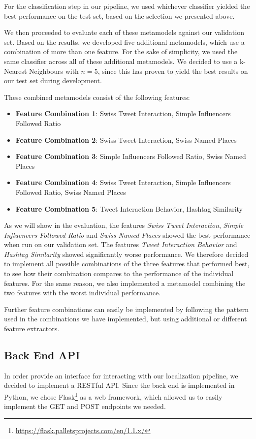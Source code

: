 \documentclass[10pt,a4paper]{article}
\begin{document}
For the classification step in our pipeline, we used whichever classifier yielded the best performance on the test set, based on the selection we presented above.

We then proceeded to evaluate each of these metamodels against our validation set. Based on the results, we developed five additional metamodels, which use a combination of more than one feature. For the sake of simplicity, we used the same classifier across all of these additional metamodels. We decided to use a k-Nearest Neighbours with $n=5$, since this has proven to yield the best results on our test set during development.

These combined metamodels consist of the following features:

\begin{itemize}
\item \textbf{Feature Combination 1}: Swiss Tweet Interaction, Simple Influencers Followed Ratio
\item \textbf{Feature Combination 2}: Swiss Tweet Interaction, Swiss Named Places
\item \textbf{Feature Combination 3}: Simple Influencers Followed Ratio, Swiss Named Places
\item \textbf{Feature Combination 4}: Swiss Tweet Interaction, Simple Influencers Followed Ratio, Swiss Named Places
\item \textbf{Feature Combination 5}: Tweet Interaction Behavior, Hashtag Similarity
\end{itemize}

As we will show in the evaluation, the features \textit{Swiss Tweet Interaction}, \textit{Simple Influencers Followed Ratio} and \textit{Swiss Named Places} showed the best performance when run on our validation set. The features \textit{Tweet Interaction Behavior} and \textit{Hashtag Similarity} showed significantly worse performance. We therefore decided to implement all possible combinations of the three features that performed best, to see how their combination compares to the performance of the individual features. For the same reason, we also implemented a metamodel combining the two features with the worst individual performance.

Further feature combinations can easily be implemented by following the pattern used in the combinations we have implemented, but using additional or different feature extractors.

\subsection{Back End API}
In order provide an interface for interacting with our localization pipeline, we decided to implement a RESTful API. Since the back end is implemented in Python, we chose Flask\footnote{\href{https://flask.palletsprojects.com/en/1.1.x/}{https://flask.palletsprojects.com/en/1.1.x/}} as a web framework, which allowed us to easily implement the GET and POST endpoints we needed.
\end{document}
